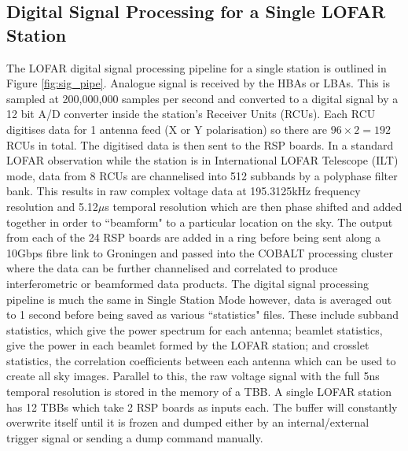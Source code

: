 \subsection{Digital Signal Processing for a Single LOFAR Station}
\label{sec:sig_pipe}
The LOFAR digital signal processing pipeline for a single station is outlined in Figure \ref{fig:sig_pipe}. Analogue signal is received by the HBAs or LBAs. This is sampled at 200,000,000 samples per second and converted to a digital signal by a 12 bit A/D converter inside the station's Receiver Units (RCUs). Each RCU digitises data for 1 antenna feed (X or Y polarisation) so there are $96 \times 2 = 192$ RCUs in total. The digitised data is then sent to the RSP boards. In a standard LOFAR observation while the station is in International LOFAR Telescope (ILT) mode, data from 8 RCUs are channelised into 512 subbands by a polyphase filter bank. This results in raw complex voltage data at 195.3125kHz frequency resolution and 5.12$\mu$s temporal resolution which are then phase shifted and added together in order to ``beamform" to a particular location on the sky. The output from each of the 24 RSP boards are added in a ring before being sent along a 10Gbps fibre link to Groningen and passed into the COBALT processing cluster where the data can be further channelised and correlated to produce interferometric or beamformed data products.
The digital signal processing pipeline is much the same in Single Station Mode however, data is averaged out to 1 second before being saved as various ``statistics" files. These include subband statistics, which give the power spectrum for each antenna; beamlet statistics, give the power in each beamlet formed by the LOFAR station; and crosslet statistics, the correlation coefficients between each antenna which can be used to create all sky images.
Parallel to this, the raw voltage signal with the full 5ns temporal resolution is stored in the memory of a TBB. A single LOFAR station has 12 TBBs which take 2 RSP boards as inputs each. The buffer will constantly overwrite itself until it is frozen and dumped either by an internal/external trigger signal or sending a dump command manually.

